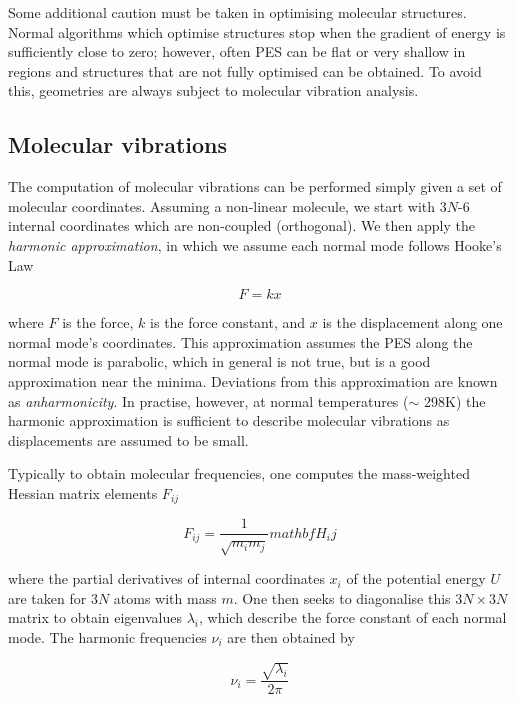 Some additional caution must be taken in optimising molecular structures. Normal algorithms which optimise structures stop when the gradient of energy is sufficiently close to zero; however, often PES can be flat or very shallow in regions and structures that are not fully optimised can be obtained. To avoid this, geometries are always subject to molecular vibration analysis.

\subsection{Molecular vibrations}

The computation of molecular vibrations can be performed simply given a set of molecular coordinates.\cite{Wilson1980} Assuming a non-linear molecule, we start with 3$N$-6 internal coordinates which are non-coupled (orthogonal). We then apply the \emph{harmonic approximation}, in which we assume each normal mode follows Hooke's Law

\begin{equation}
  F = kx
\end{equation}


\noindent where $F$ is the force, $k$ is the force constant, and $x$ is the displacement along one normal mode's coordinates. This approximation assumes the PES along the normal mode is parabolic, which in general is not true, but is a good approximation near the minima. Deviations from this approximation are known as \emph{anharmonicity}. In practise, however, at normal temperatures ($\sim$ 298K) the harmonic approximation is sufficient to describe molecular vibrations as displacements are assumed to be small.

Typically to obtain molecular frequencies, one computes the mass-weighted Hessian matrix elements $F_{ij}$

\begin{equation}
  F_{ij} = \frac{1}{\sqrt{m_im_j}} mathbf{H}_ij
\end{equation}

\noindent where the partial derivatives of internal coordinates $x_i$ of the potential energy $U$ are taken for 3$N$ atoms with mass $m$. One then seeks to diagonalise this $3N\times3N$ matrix to obtain eigenvalues $\lambda_i$, which describe the force constant of each normal mode. The harmonic frequencies $\nu_i$ are then obtained by

\begin{equation}
  \nu_i = \frac{\sqrt{\lambda_i}}{2\pi}
\end{equation}

